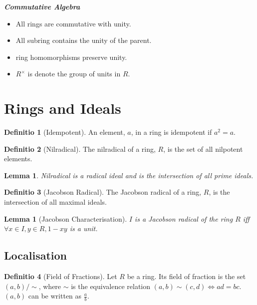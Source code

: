 \documentclass[12pt, a4paper]{article}
\newtheorem{lemma}[theorem]{Lemma}
\theoremstyle{definition}
\newtheorem{definition}{Definitio}
\theoremstyle{remark}
\renewcommand{\emph}[1]{\textbf{\textit{#1}}}
\begin{document}
{ \huge
	\emph{Commutative Algebra}
}

\begin{itemize}
	\item All rings are commutative with unity.
	\item All subring contains the unity of the parent.
	\item ring homomorphisms preserve unity.
	\item $R^{\times}$ is denote the group of units in $R$.
\end{itemize}

\section{Rings and Ideals}

\begin{definition}[Idempotent]
An element, $a$, in a ring is idempotent if $a^2 = a$.
\end{definition}

\begin{definition}[Nilradical]
	The nilradical of a ring, $R$, is the set of all nilpotent elements.
\end{definition}

\begin{lemma}
	Nilradical is a radical ideal and is the intersection of all prime ideals.
\end{lemma}

\begin{definition}[Jacobson Radical]
	The Jacobson radical of a ring, $R$, is the intersection of all maximal ideals.
\end{definition}

\begin{lemma}[Jacobson Characterisation]
	$I$ is a Jacobson radical of the ring $R$ iff $\forall x \in I, y \in R, 1-xy$ is a unit.
\end{lemma}

\subsection{Localisation}

\begin{definition}[Field of Fractions]
	Let $R$ be a ring. Its field of fraction is the set $(a,b) \slash \sim$, where $\sim$ is the equivalence relation $(a,b) \sim (c,d) \iff ad = bc$.
	$(a,b)$ can be written as $\frac{a}{b}$.
\end{definition}
\end{document}
